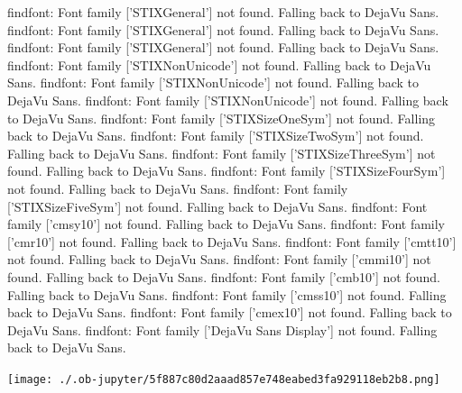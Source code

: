 \documentclass[11pt]{article}
\begin{document}
findfont: Font family ['STIXGeneral'] not found. Falling back to DejaVu Sans.
findfont: Font family ['STIXGeneral'] not found. Falling back to DejaVu Sans.
findfont: Font family ['STIXGeneral'] not found. Falling back to DejaVu Sans.
findfont: Font family ['STIXNonUnicode'] not found. Falling back to DejaVu Sans.
findfont: Font family ['STIXNonUnicode'] not found. Falling back to DejaVu Sans.
findfont: Font family ['STIXNonUnicode'] not found. Falling back to DejaVu Sans.
findfont: Font family ['STIXSizeOneSym'] not found. Falling back to DejaVu Sans.
findfont: Font family ['STIXSizeTwoSym'] not found. Falling back to DejaVu Sans.
findfont: Font family ['STIXSizeThreeSym'] not found. Falling back to DejaVu Sans.
findfont: Font family ['STIXSizeFourSym'] not found. Falling back to DejaVu Sans.
findfont: Font family ['STIXSizeFiveSym'] not found. Falling back to DejaVu Sans.
findfont: Font family ['cmsy10'] not found. Falling back to DejaVu Sans.
findfont: Font family ['cmr10'] not found. Falling back to DejaVu Sans.
findfont: Font family ['cmtt10'] not found. Falling back to DejaVu Sans.
findfont: Font family ['cmmi10'] not found. Falling back to DejaVu Sans.
findfont: Font family ['cmb10'] not found. Falling back to DejaVu Sans.
findfont: Font family ['cmss10'] not found. Falling back to DejaVu Sans.
findfont: Font family ['cmex10'] not found. Falling back to DejaVu Sans.
findfont: Font family ['DejaVu Sans Display'] not found. Falling back to DejaVu Sans.
\begin{center}
\texttt{[image: ./.ob-jupyter/5f887c80d2aaad857e748eabed3fa929118eb2b8.png]}
\end{center}
\end{document}
